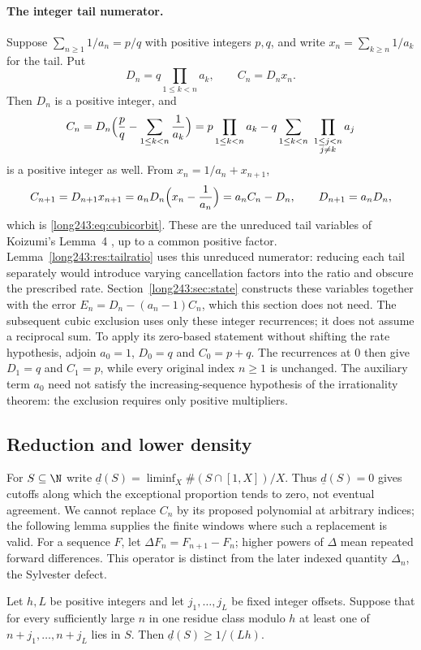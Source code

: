 \paragraph{The integer tail numerator.}
Suppose $\sum_{n\ge1}1/a_n=p/q$ with positive integers $p,q$, and write
$x_n=\sum_{k\ge n}1/a_k$ for the tail.  Put
\[
 D_n=q\prod_{1\le k<n}a_k,\qquad C_n=D_nx_n .
\]
Then $D_n$ is a positive integer, and
\[
 C_n=D_n\Bigl(\frac pq-\sum_{1\le k<n}\frac1{a_k}\Bigr)
    =p\prod_{1\le k<n}a_k-q\sum_{1\le k<n}\ \prod_{\substack{1\le j<n\\ j\ne k}}a_j
\]
is a positive integer as well.  From $x_n=1/a_n+x_{n+1}$,
\[
 C_{n+1}=D_{n+1}x_{n+1}=a_nD_n\Bigl(x_n-\frac1{a_n}\Bigr)=a_nC_n-D_n,
 \qquad D_{n+1}=a_nD_n,
\]
which is \eqref{long243:eq:cubicorbit}. These are the unreduced tail variables of Koizumi's
Lemma~4 \cite[pp.~11--12]{koizumi2025}, up to a common positive factor.
Lemma~\ref{long243:res:tailratio} uses this unreduced numerator:
reducing each tail separately would introduce varying cancellation
factors into the ratio and obscure the prescribed rate.
Section~\ref{long243:sec:state} constructs these variables together with
the error $E_n=D_n-(a_n-1)C_n$, which this section does not need.  The subsequent cubic exclusion uses only these integer recurrences;
it does not assume a reciprocal sum. To apply its zero-based statement
without shifting the rate hypothesis, adjoin $a_0=1$, $D_0=q$ and
$C_0=p+q$. The recurrences at $0$ then give $D_1=q$ and $C_1=p$,
while every original index $n\ge1$ is unchanged. The auxiliary term
$a_0$ need not satisfy the increasing-sequence hypothesis of the
irrationality theorem: the exclusion requires only positive multipliers.

\subsection{Reduction and lower density}

For $S\subseteq\N$ write $\underline d(S)=\liminf_X\#(S\cap[1,X])/X$.
Thus $\underline d(S)=0$ gives cutoffs along which the exceptional
proportion tends to zero, not eventual agreement. We cannot replace
$C_n$ by its proposed polynomial at arbitrary indices; the following
lemma supplies the finite windows where such a replacement is valid.
For a sequence $F$, let $\Delta F_n=F_{n+1}-F_n$; higher powers of
$\Delta$ mean repeated forward differences. This operator is distinct
from the later indexed quantity $\Delta_n$, the Sylvester defect.

\begin{lemma}\label{long243:res:periodicobstruction}
Let $h,L$ be positive integers and let $j_1,\ldots,j_L$ be fixed integer
offsets. Suppose that for every sufficiently large $n$ in one residue
class modulo $h$ at least one of $n+j_1,\ldots,n+j_L$ lies in $S$.
Then $\underline d(S)\ge1/(Lh)$.
\end{lemma}


